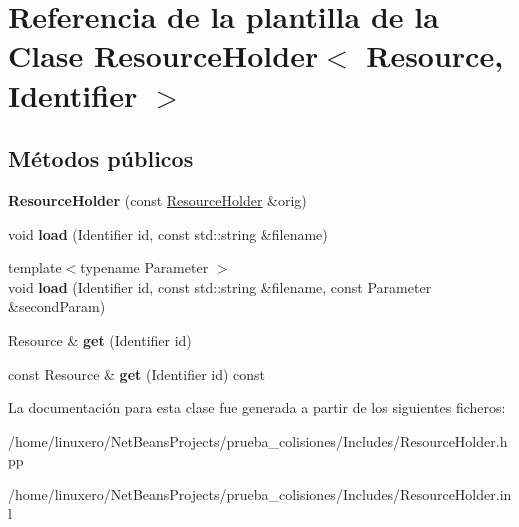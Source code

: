 \hypertarget{classResourceHolder}{\section{Referencia de la plantilla de la Clase Resource\-Holder$<$ Resource, Identifier $>$}
\label{classResourceHolder}
}
\subsection*{Métodos públicos}
\begin{DoxyCompactItemize}
\item 
\hypertarget{classResourceHolder_a26b116af6b3c9e607bc3e1d4b2d46f25}{{\bfseries Resource\-Holder} (const \hyperlink{classResourceHolder}{Resource\-Holder} \&orig)}\label{classResourceHolder_a26b116af6b3c9e607bc3e1d4b2d46f25}

\item 
\hypertarget{classResourceHolder_accb6a2b6bd2da503ddfd57b5c0028a16}{void {\bfseries load} (Identifier id, const std\-::string \&filename)}\label{classResourceHolder_accb6a2b6bd2da503ddfd57b5c0028a16}

\item 
\hypertarget{classResourceHolder_ae83a7a88b2b2a74b6143796eb4452110}{{\footnotesize template$<$typename Parameter $>$ }\\void {\bfseries load} (Identifier id, const std\-::string \&filename, const Parameter \&second\-Param)}\label{classResourceHolder_ae83a7a88b2b2a74b6143796eb4452110}

\item 
\hypertarget{classResourceHolder_a6452638a75b6df7ea7d610f204632850}{Resource \& {\bfseries get} (Identifier id)}\label{classResourceHolder_a6452638a75b6df7ea7d610f204632850}

\item 
\hypertarget{classResourceHolder_a9cdb23504de69625ec8405e94a45448f}{const Resource \& {\bfseries get} (Identifier id) const }\label{classResourceHolder_a9cdb23504de69625ec8405e94a45448f}

\end{DoxyCompactItemize}


La documentación para esta clase fue generada a partir de los siguientes ficheros\-:\begin{DoxyCompactItemize}
\item 
/home/linuxero/\-Net\-Beans\-Projects/prueba\-\_\-colisiones/\-Includes/Resource\-Holder.\-hpp\item 
/home/linuxero/\-Net\-Beans\-Projects/prueba\-\_\-colisiones/\-Includes/Resource\-Holder.\-inl\end{DoxyCompactItemize}
